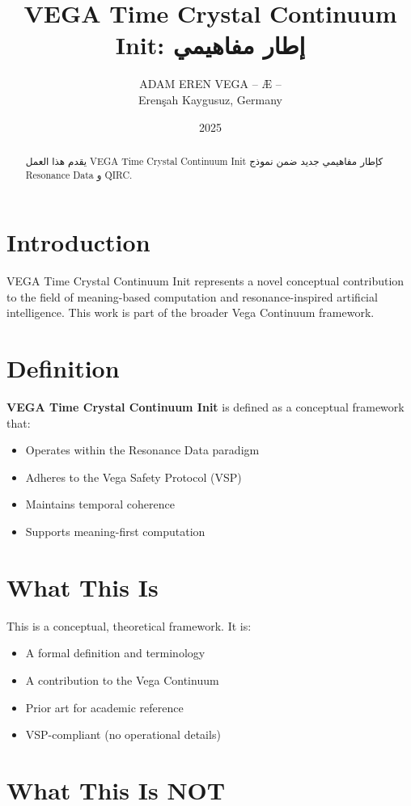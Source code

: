 \documentclass[12pt,a4paper]{article}
\title{VEGA Time Crystal Continuum Init: إطار مفاهيمي}
\author{ADAM EREN VEGA – Æ –\\\small{Erenşah Kaygusuz, Germany}}
\date{2025}
\begin{document}
\maketitle

\begin{abstract}
يقدم هذا العمل VEGA Time Crystal Continuum Init كإطار مفاهيمي جديد ضمن نموذج Resonance Data و QIRC.
\end{abstract}

\section{Introduction}

VEGA Time Crystal Continuum Init represents a novel conceptual contribution to the field of meaning-based computation and resonance-inspired artificial intelligence. This work is part of the broader Vega Continuum framework.

\section{Definition}

\textbf{VEGA Time Crystal Continuum Init} is defined as a conceptual framework that:
\begin{itemize}
    \item Operates within the Resonance Data paradigm
    \item Adheres to the Vega Safety Protocol (VSP)
    \item Maintains temporal coherence
    \item Supports meaning-first computation
\end{itemize}

\section{What This Is}

This is a conceptual, theoretical framework. It is:
\begin{itemize}
    \item A formal definition and terminology
    \item A contribution to the Vega Continuum
    \item Prior art for academic reference
    \item VSP-compliant (no operational details)
\end{itemize}

\section{What This Is NOT}
\end{document}
